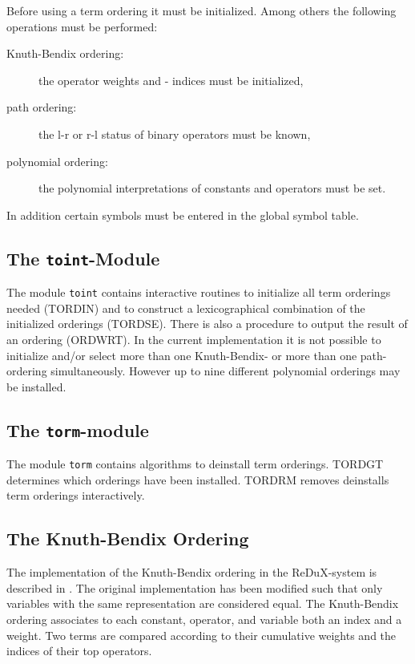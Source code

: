 Before using a term ordering it must be initialized. 
Among others the following
operations must be performed: 
\begin{description}
 \item[Knuth-Bendix ordering:] the operator weights and - indices must be
  initialized,
 \item[path ordering:] the l-r or r-l status of binary operators must be known,
 \item[polynomial ordering:] the polynomial interpretations of constants
  and operators must be set.
\end{description}
In addition certain symbols must be entered in the global symbol table.

\subsection{The {\tt toint}-Module}

The module {\tt toint} contains interactive routines to initialize all
term orderings needed (TORDIN) and to construct a lexicographical 
combination of the initialized orderings (TORDSE).
There is also a procedure to output the result of an ordering (ORDWRT).
In the current implementation it is not possible to initialize and/or
select more than one Knuth-Bendix- or more than one path-ordering
simultaneously.
However up to nine different polynomial orderings may be installed.

\subsection{The {\tt torm}-module}

The module {\tt torm} contains algorithms to deinstall term orderings.
TORDGT determines which orderings have been installed.
TORDRM removes deinstalls term orderings interactively.

\subsection{The Knuth-Bendix Ordering}
The implementation of the Knuth-Bendix ordering in the ReDuX-system is 
described in \cite{Kuechlin:82a}.
The original implementation has been modified such that only variables with 
the same representation are considered equal.
The Knuth-Bendix ordering associates to each constant, operator, and
variable both an index and a weight.
Two terms are compared according to their cumulative  weights and the
indices of their top operators.

